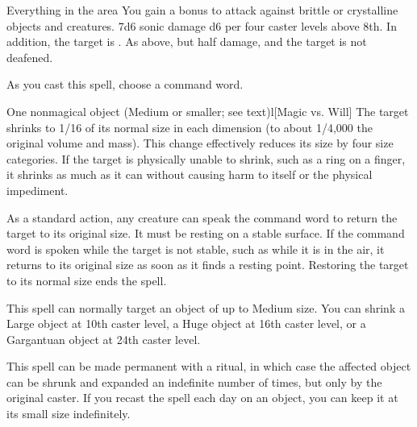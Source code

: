 \begin{spellheader}
\end{spellheader}
\begin{spelleffects}
    \begin{spelltargets}{Everything in the area}
        \spellspecial You gain a  bonus to attack against brittle or crystalline objects and creatures.
        \spellsuccess 7d6 sonic damage \add d6 per four caster levels above 8th. In addition, the target is \deafened.
        \spellfailure As above, but half damage, and the target is not deafened.
    \end{spelltargets}
\end{spelleffects}
\begin{spellfooter}
    
\end{spellfooter}

\begin{spellheader}
    \spellrng{\rngclose}
    \spellspecial As you cast this spell, choose a command word.
\end{spellheader}
\begin{spelleffects}
    \begin{spelltarget}{One nonmagical object (Medium or smaller; see text)}l[Magic vs. Will]
        \spellsuccess The target shrinks to 1/16 of its normal size in each dimension (to about 1/4,000 the original volume and mass). This change effectively reduces its size by four size categories. If the target is physically unable to shrink, such as a ring on a finger, it shrinks as much as it can without causing harm to itself or the physical impediment.

        As a standard action, any creature can speak the command word to return the target to its original size. It must be resting on a stable surface. If the command word is spoken while the target is not stable, such as while it is in the air, it returns to its original size as soon as it finds a resting point. Restoring the target to its normal size ends the spell.
    \end{spelltarget}
\end{spelleffects}
\begin{spellfooter}
    \spellnotes This spell can normally target an object of up to Medium size. You can shrink a Large object at 10th caster level, a Huge object at 16th caster level, or a Gargantuan object at 24th caster level.
    \par This spell can be made permanent with a  ritual, in which case the affected object can be shrunk and expanded an indefinite number of times, but only by the original caster. If you recast the spell each day on an object, you can keep it at its small size indefinitely.
\end{spellfooter}

